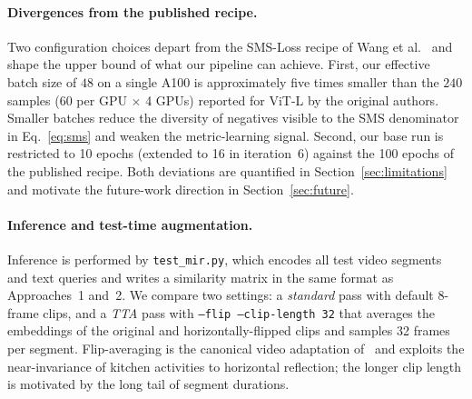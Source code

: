 \paragraph{Divergences from the published recipe.}
Two configuration choices depart from the SMS-Loss recipe of Wang et al.~\cite{wang2024symmetricmultisimilaritylossepickitchens100} and shape the upper bound of what our pipeline can achieve. First, our effective batch size of $48$ on a single A100 is approximately five times smaller than the $240$ samples (60 per GPU $\times$ 4 GPUs) reported for ViT-L by the original authors. Smaller batches reduce the diversity of negatives visible to the SMS denominator in Eq.~\eqref{eq:sms} and weaken the metric-learning signal. Second, our base run is restricted to 10 epochs (extended to 16 in iteration~6) against the 100 epochs of the published recipe. Both deviations are quantified in Section~\ref{sec:limitations} and motivate the future-work direction in Section~\ref{sec:future}.

\paragraph{Inference and test-time augmentation.}
Inference is performed by \texttt{test\_mir.py}, which encodes all test video segments and text queries and writes a similarity matrix in the same format as Approaches~1 and~2. We compare two settings: a \emph{standard} pass with default 8-frame clips, and a \emph{TTA} pass with \texttt{--flip --clip-length 32} that averages the embeddings of the original and horizontally-flipped clips and samples 32 frames per segment. Flip-averaging is the canonical video adaptation of~\cite{krizhevsky2012alexnet} and exploits the near-invariance of kitchen activities to horizontal reflection; the longer clip length is motivated by the long tail of segment durations.
